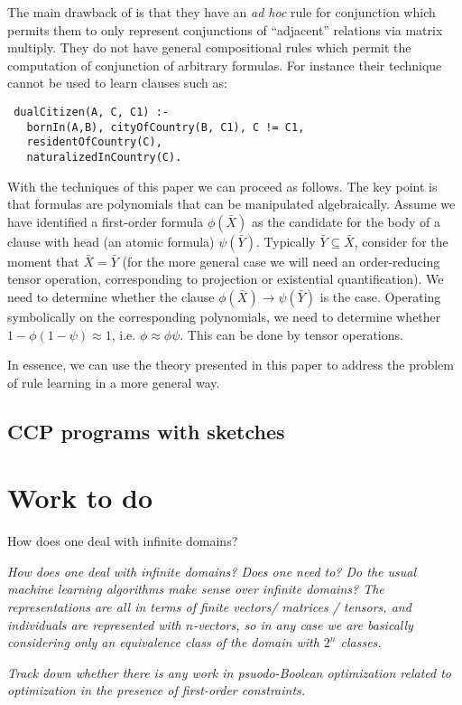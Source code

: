 \documentclass{article} %
\begin{document}
The main drawback of \cite{bishan-iclr15} is that they have an {\em ad hoc} rule for conjunction which permits them to only represent conjunctions of ``adjacent'' relations via matrix multiply. They do not have general compositional rules which permit the computation of conjunction of arbitrary formulas. For instance their technique cannot be used to learn clauses such as: 
\begin{lstlisting}
 dualCitizen(A, C, C1) :- 
   bornIn(A,B), cityOfCountry(B, C1), C != C1, 
   residentOfCountry(C), 
   naturalizedInCountry(C).
\end{lstlisting}
With the techniques of this paper we can proceed as follows. The key point is that formulas are polynomials that can be manipulated algebraically. Assume we have identified a first-order formula $\phi(\bar{X})$ as the candidate for the body of a clause with head (an atomic formula) $\psi(\bar{Y})$. Typically $\bar{Y}\subseteq \bar{X}$, consider for the moment that $\bar{X}=\bar{Y}$ (for the more general case we will need an order-reducing tensor operation, corresponding to projection or existential quantification). We need to determine whether the clause $\phi(\bar{X})\rightarrow \psi(\bar{Y})$ is the case. Operating symbolically on the corresponding polynomials, we need to determine whether $1-\phi(1-\psi) \approx 1$, i.e.{} $\phi \approx \phi\psi$. This can be done by tensor operations. 

In essence, we can use the theory presented in this paper to address the problem of rule learning in a more general way.

\subsection{CCP programs with sketches}

\section{Work to do}

How does one deal with infinite domains?

{\em How does one deal with infinite domains? Does one need to? Do the
usual machine learning algorithms make sense over infinite domains?
The representations are all in terms of finite vectors/ matrices /
tensors, and individuals are represented with $n$-vectors, so in any
case we are basically considering only an equivalence class of the
domain with $2^n$ classes.}

{\em Track down whether there is any work in psuodo-Boolean
  optimization related to optimization in the presence of first-order
  constraints.
}
\end{document}

